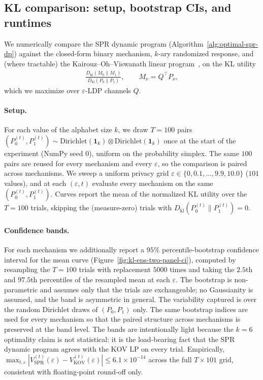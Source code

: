 \documentclass{article}
\theoremstyle{plain}
\theoremstyle{definition}
\theoremstyle{plain}
\newcommand{\eps}{\varepsilon}
\begin{document}
\subsection{KL comparison: setup, bootstrap CIs, and runtimes}
\label{sec:experiments-kl}

We numerically compare the SPR dynamic program (Algorithm~\ref{alg:optimal-spr-dp}) against the closed-form binary mechanism, $k$-ary randomized response, and (where tractable) the Kairouz--Oh--Viswanath linear program~\cite{Kairouz2016ExtremalMechanisms}, on the KL utility
\begin{align*}
    \frac{D_{\mathrm{kl}}(M_0\|M_1)}{D_{\mathrm{kl}}(P_0\|P_1)},
    \qquad
    M_\nu=Q^{\!\top}P_\nu,
\end{align*}
which we maximize over $\eps$-LDP channels $Q$.

\paragraph{Setup.}
For each value of the alphabet size $k$, we draw $T=100$ pairs
$(P_0^{(t)},P_1^{(t)})\sim\mathrm{Dirichlet}(\mathbf 1_k)\otimes\mathrm{Dirichlet}(\mathbf 1_k)$ once at the start of the experiment (NumPy seed $0$), uniform on the probability simplex. The same $100$ pairs are reused for every mechanism and every $\eps$, so the comparison is paired across mechanisms. We sweep a uniform privacy grid $\eps\in\{0,0.1,\dots,9.9,10.0\}$ ($101$ values), and at each $(\eps,t)$ evaluate every mechanism on the same $(P_0^{(t)},P_1^{(t)})$. Curves report the mean of the normalized KL utility over the $T=100$ trials, skipping the (measure-zero) trials with $D_{\mathrm{kl}}(P_0^{(t)}\|P_1^{(t)})=0$.

\paragraph{Confidence bands.}
For each mechanism we additionally report a $95\%$ percentile-bootstrap confidence interval for the mean curve (Figure~\ref{fig:kl-eps-two-panel-ci}), computed by resampling the $T=100$ trials with replacement $5000$ times and taking the $2.5$th and $97.5$th percentiles of the resampled mean at each $\eps$. The bootstrap is non-parametric and assumes only that the trials are exchangeable; no Gaussianity is assumed, and the band is asymmetric in general. The variability captured is over the random Dirichlet draws of $(P_0,P_1)$ only. The same bootstrap indices are used for every mechanism so that the paired structure across mechanisms is preserved at the band level. The bands are intentionally light because the $k=6$ optimality claim is not statistical: it is the load-bearing fact that the SPR dynamic program agrees with the KOV LP on every trial. Empirically, $\max_{t,\eps}|V_{\mathrm{SPR}}^{(t)}(\eps)-V_{\mathrm{KOV}}^{(t)}(\eps)|\le 6.1\times 10^{-14}$ across the full $T\times 101$ grid, consistent with floating-point round-off only.
\end{document}

